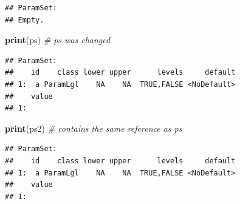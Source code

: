 \documentclass[]{article}
\newenvironment{Shaded}{\begin{snugshade}}{\end{snugshade}}
\newcommand{\CommentTok}[1]{\textcolor[rgb]{0.56,0.35,0.01}{\textit{#1}}}
\newcommand{\DataTypeTok}[1]{\textcolor[rgb]{0.13,0.29,0.53}{#1}}
\newcommand{\KeywordTok}[1]{\textcolor[rgb]{0.13,0.29,0.53}{\textbf{#1}}}
\newcommand{\NormalTok}[1]{#1}
\newcommand{\OperatorTok}[1]{\textcolor[rgb]{0.81,0.36,0.00}{\textbf{#1}}}
\newcommand{\OtherTok}[1]{\textcolor[rgb]{0.56,0.35,0.01}{#1}}
\newcommand{\StringTok}[1]{\textcolor[rgb]{0.31,0.60,0.02}{#1}}
\renewenvironment{Shaded} {\begin{snugshade}\small} {\end{snugshade}}
\begin{document}
\begin{Shaded}
\end{Shaded}

\begin{verbatim}
## ParamSet: 
## Empty.
\end{verbatim}

\begin{Shaded}
\end{Shaded}

\begin{Shaded}
\begin{Highlighting}[]
\KeywordTok{print}\NormalTok{(ps)  }\CommentTok{# ps was changed}
\end{Highlighting}
\end{Shaded}

\begin{verbatim}
## ParamSet: 
##    id    class lower upper      levels     default
## 1:  a ParamLgl    NA    NA  TRUE,FALSE <NoDefault>
##    value
## 1:
\end{verbatim}

\begin{Shaded}
\begin{Highlighting}[]
\KeywordTok{print}\NormalTok{(ps2) }\CommentTok{# contains the same reference as ps}
\end{Highlighting}
\end{Shaded}

\begin{verbatim}
## ParamSet: 
##    id    class lower upper      levels     default
## 1:  a ParamLgl    NA    NA  TRUE,FALSE <NoDefault>
##    value
## 1:
\end{verbatim}
\end{document}
